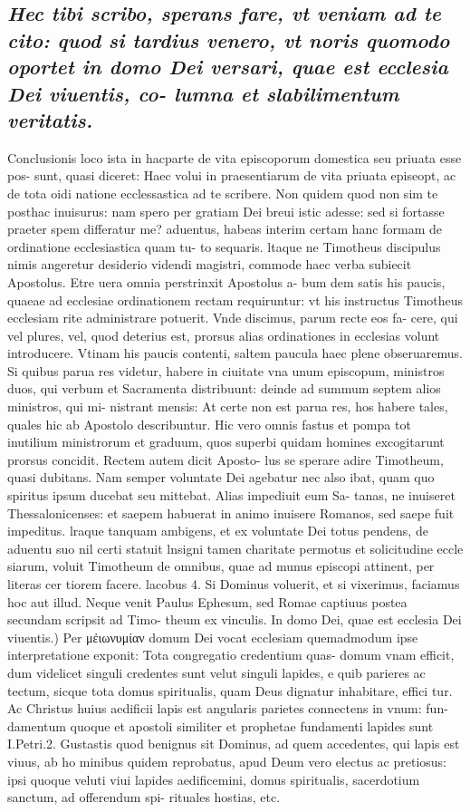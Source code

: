 \documentclass{article}
\begin{document}
\begin{pages}
\subsection*{\textit{Hec tibi scribo, sperans fare, vt veniam ad te cito: quod si tardius venero, vt noris quomodo oportet in domo Dei versari, quae est ecclesia Dei viuentis, co- lumna et slabilimentum veritatis. }}\pstart Conclusionis loco ista in hacparte de vita episcoporum domestica seu priuata esse pos- sunt, quasi diceret: Haec volui in praesentiarum de vita priuata episeopt, ac de tota oidi natione ecclessastica ad te scribere. Non quidem quod non sim te posthac inuisurus: nam spero per gratiam Dei breui istic adesse: sed si fortasse praeter spem differatur me? aduentus, habeas interim certam hanc formam de ordinatione ecclesiastica quam tu- to sequaris. ltaque ne Timotheus discipulus nimis angeretur desiderio videndi magistri, commode haec verba subiecit Apostolus. Etre uera omnia perstrinxit Apostolus a- bum dem satis his paucis, quaeae ad ecclesiae ordinationem rectam requiruntur: vt his instructus Timotheus ecclesiam rite administrare potuerit. Vnde discimus, parum recte eos fa- cere, qui vel plures, vel, quod deterius est, prorsus alias ordinationes in ecclesias volunt introducere. Vtinam his paucis contenti, saltem paucula haec plene obseruaremus. Si quibus parua res videtur, habere in ciuitate vna unum episcopum, ministros duos, qui verbum et Sacramenta distribuunt: deinde ad summum septem alios ministros, qui mi- nistrant mensis: At certe non est parua res, hos habere tales, quales hic ab Apostolo describuntur. Hic vero omnis fastus et pompa tot inutilium ministrorum et graduum, quos superbi quidam homines excogitarunt prorsus concidit. Rectem autem dicit Aposto- lus se sperare adire Timotheum, quasi dubitans. Nam semper voluntate Dei agebatur nec also ibat, quam quo spiritus ipsum ducebat seu mittebat. Alias impediuit eum Sa- tanas, ne inuiseret Thessalonicenses: et saepem habuerat in animo inuisere Romanos, sed saepe fuit impeditus. lraque tanquam ambigens, et ex voluntate Dei totus pendens, de aduentu suo nil certi statuit lnsigni tamen charitate permotus et solicitudine eccle siarum, voluit Timotheum de omnibus, quae ad munus episcopi attinent, per literas cer tiorem facere. lacobus 4. Si Dominus voluerit, et si vixerimus, faciamus hoc aut illud. Neque venit Paulus Ephesum, sed Romae captiuus postea secundam scripsit ad Timo- theum ex vinculis.  \pend\pstart In domo Dei, quae est ecclesia Dei viuentis.) Per μἐιωνυμίαν domum Dei vocat ecclesiam quemadmodum ipse interpretatione exponit: Tota congregatio credentium quas- domum vnam efficit, dum videlicet singuli credentes sunt velut singuli lapides, e quib parieres ac tectum, sicque tota domus spiritualis, quam Deus dignatur inhabitare, effici tur. Ac Christus huius aedificii lapis est angularis parietes connectens in vnum: fun- damentum quoque et apostoli similiter et prophetae fundamenti lapides sunt I.Petri.2. Gustastis quod benignus sit Dominus, ad quem accedentes, qui lapis est viuus, ab ho minibus quidem reprobatus, apud Deum vero electus ac pretiosus: ipsi quoque veluti viui lapides aedificemini, domus spiritualis, sacerdotium sanctum, ad offerendum spi- rituales hostias, etc. 
\end{pages}
\end{document}
